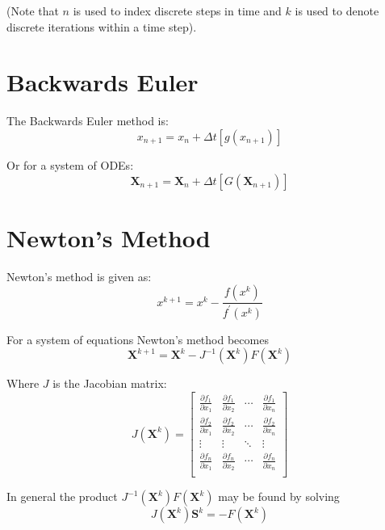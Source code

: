 \documentclass[11pt]{article}
\begin{document}
(Note that $n$ is used to index discrete steps in time and $k$ is used to denote discrete iterations within a time step).
\section{Backwards Euler}
The Backwards Euler method is:
\begin{equation}
  x_{n+1} = x_n + \Delta t \left[g\left(x_{n+1}\right)\right]
\end{equation}

Or for a system of ODEs:
\begin{equation}
  \mathbf{X}_{n+1} = \mathbf{X}_n + \Delta t \left[G\left(\mathbf{X}_{n+1}\right)\right]
\end{equation}
\section{Newton's Method}
Newton's method is given as:
\begin{equation}
x^{k+1} = x^k - \frac{f(x^k)}{f^\prime(x^k)}
\end{equation}

For a system of equations Newton's method becomes
\begin{equation}
  \mathbf{X}^{k+1} = \mathbf{X}^k - J^{-1}(\mathbf{X}^k) F(\mathbf{X}^k)
\end{equation}

Where $J$ is the Jacobian matrix:
\begin{equation}
  J(\mathbf{X}^k) =
  \begin{bmatrix}
    \frac{\partial f_1}{\partial x_1} & \frac{\partial f_1}{\partial x_2} & \cdots & \frac{\partial f_1}{\partial x_n}\\
    \frac{\partial f_2}{\partial x_1} & \frac{\partial f_2}{\partial x_2} & \cdots & \frac{\partial f_2}{\partial x_n} \\
    \vdots & \vdots & \ddots & \vdots \\
    \frac{\partial f_n}{\partial x_1} & \frac{\partial f_n}{\partial x_2} & \cdots & \frac{\partial f_n}{\partial x_n} \\
  \end{bmatrix}
\end{equation}

In general the product $J^{-1}(\mathbf{X}^k) F(\mathbf{X}^k)$ may be found by solving
\begin{equation}
  J(\mathbf{X}^k) \mathbf{S}^k = -F(\mathbf{X}^k)
\end{equation}
\end{document}
